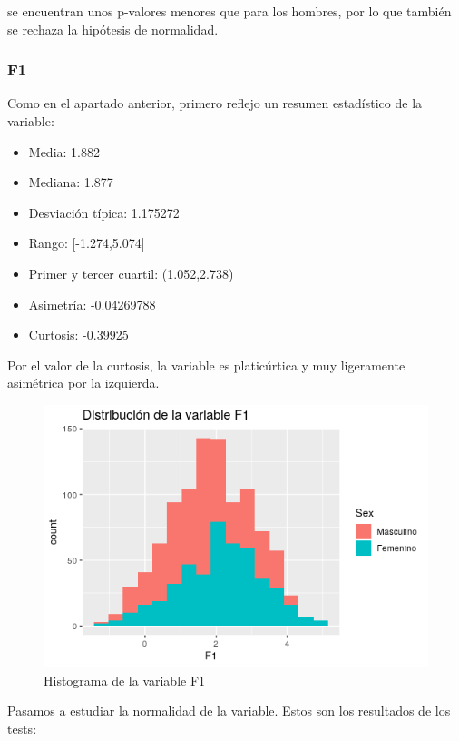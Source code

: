 se encuentran unos p-valores menores que para los hombres, por lo que también se rechaza la hipótesis de normalidad.

\subsubsection{F1}

Como en el apartado anterior, primero reflejo un resumen estadístico de la variable:

\begin{itemize}
	\item Media: 1.882
	\item Mediana: 1.877
	\item Desviación típica: 1.175272
	\item Rango: [-1.274,5.074]
	\item Primer y tercer cuartil: (1.052,2.738)
	\item Asimetría: -0.04269788
	\item Curtosis: -0.39925
\end{itemize}

Por el valor de la curtosis, la variable es platicúrtica y muy ligeramente asimétrica por la izquierda.

\begin{figure}[H] %
	\centering
	\includegraphics[scale=0.6]{dist-F1.png}  %
	\caption{Histograma de la variable F1} 
	\label{fig:hist-F1}
\end{figure}

Pasamos a estudiar la normalidad de la variable. Estos son los resultados de los tests:

